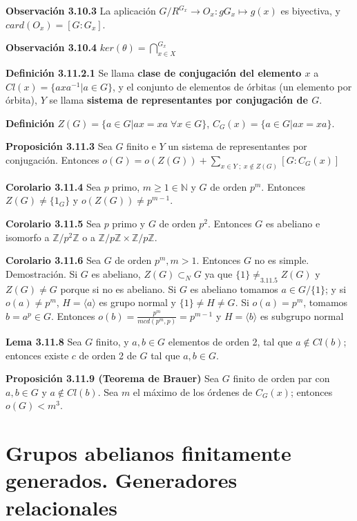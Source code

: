 \documentclass[a4paper, 11pt]{extarticle}
\newcommand{\propo}[1]{\textcolor{rojo}{\textbf{Proposición #1}}}
\newcommand{\defi}[1]{\textcolor{azul}{\textbf{Definición #1}}}
\newcommand{\obs}[1]{\textcolor{verde}{\textbf{Observación #1}}}
\newcommand{\lema}[1]{\textcolor{rosa}{\textbf{Lema #1}}}
\newcommand{\cor}[1]{\textcolor{rosa}{\textbf{Corolario #1}}}
\newcommand{\dem}[1]{\textcolor{gris}{\small{Demostración. #1}}}
\begin{document}
\obs{3.10.3} La aplicación \(G/R^{G_x} \rightarrow O_x: gG_x \mapsto g(x)\) es biyectiva, y \(card(O_x) = [G:G_x]\). 

\obs{3.10.4} \(ker(\theta) = \bigcap_{x \in X}^{G_x}\)

\defi{3.11.2.1} Se llama \textbf{clase de conjugación del elemento \(x\)} a \(Cl(x) =
\{ axa^{-1} | a \in G \}\), y el conjunto de elementos de órbitas (un elemento
por órbita), \(Y\) se llama \textbf{sistema de representantes por conjugación de \(G\)}.

\defi{} \(Z(G) = \{ a \in G | ax = xa \; \forall x \in G \}\), \(C_G(x) = \{ a \in
G | ax = xa \}\).

\propo{3.11.3} Sea \(G\) finito e \(Y\) un sistema de representantes por
conjugación. Entonces \(o(G) = o(Z(G)) + \sum _{x \in Y\;;\;x \not\in Z(G)}^{} [G:C_G(x)]\)

\cor{3.11.4} Sea \(p\) primo, \(m \ge 1 \in \mathbb{N}\) y \(G\) de orden \(p^m\).
Entonces \(Z(G) \neq \{1_G\}\) y \(o(Z(G)) \neq p^{m-1}\).

\cor{3.11.5} Sea \(p\) primo y \(G\) de orden \(p^2\). Entonces \(G\) es 
abeliano e isomorfo a \(\mathbb{Z}/p^2 \mathbb{Z}\) o a \(\mathbb{Z}/p \mathbb{Z} \times  \mathbb{Z}/p \mathbb{Z}\).

\cor{3.11.6} Sea \(G\) de orden \(p^m, m > 1\). Entonces \(G\) no es
simple.
\dem{ Si \( G \) es abeliano, \( Z(G) \subset_N G \) ya que \( \{ 1 \} \neq_{3.11.5} Z(G) \) y \( Z(G) \neq G \) 
porque si no es abeliano.  
Si \( G \) es abeliano tomamos \( a \in G/\{1\} \); y si \( o(a) \neq p^m \), \( H = \langle a \rangle \)
es grupo normal y \( \{1\} \neq H \neq G \).
Si \( o(a) = p^m \), tomamos \( b = a^p \in G \). Entonces \( o(b) = \frac{p^m}{mcd(p^m,p)} = p^{m-1} \) y 
\( H = \langle b \rangle \) es subgrupo normal}

\lema{3.11.8} Sea \(G\) finito, y \(a,b \in G\) elementos de orden 2, tal que
\(a \not\in Cl(b)\); entonces existe \(c\) de orden 2 de \(G\) tal que \(a,b \in
G\).

\propo{3.11.9 (Teorema de Brauer)} Sea \(G\) finito de orden par con \(a,b \in
G\) y \(a \not\in Cl(b)\). Sea \(m\) el máximo de los órdenes de \(C_G(x)\);
entonces \(o(G) < m^3\). 

\section*{Grupos abelianos finitamente generados. Generadores relacionales}
\label{sec:org05363ea}
\end{document}
